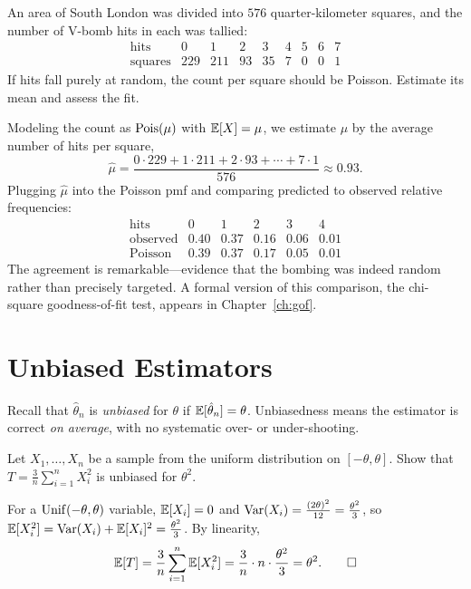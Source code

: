 \begin{example}
An area of South London was divided into $576$ quarter-kilometer squares, and the
number of V-bomb hits in each was tallied:
\[
\begin{array}{c|cccccccc}
\text{hits} & 0 & 1 & 2 & 3 & 4 & 5 & 6 & 7\\\hline
\text{squares} & 229 & 211 & 93 & 35 & 7 & 0 & 0 & 1
\end{array}
\]
If hits fall purely at random, the count per square should be Poisson. Estimate
its mean and assess the fit.

\solution Modeling the count as $\mathrm{Pois}(\mu)$ with $\mathbb{E}[X]=\mu$, we estimate $\mu$
by the average number of hits per square,
\[
  \hat\mu=\frac{0\cdot 229+1\cdot 211+2\cdot 93+\cdots+7\cdot 1}{576}\approx 0.93.
\]
Plugging $\hat\mu$ into the Poisson pmf and comparing predicted to observed
relative frequencies:
\[
\begin{array}{c|ccccc}
\text{hits} & 0 & 1 & 2 & 3 & 4\\\hline
\text{observed} & 0.40 & 0.37 & 0.16 & 0.06 & 0.01\\
\text{Poisson} & 0.39 & 0.37 & 0.17 & 0.05 & 0.01
\end{array}
\]
The agreement is remarkable—evidence that the bombing was indeed random rather
than precisely targeted. A formal version of this comparison, the chi-square
goodness-of-fit test, appears in Chapter~\ref{ch:gof}.
\end{example}

\section{Unbiased Estimators}

Recall that $\hat\theta_n$ is \emph{unbiased} for $\theta$ if
$\mathbb{E}[\hat\theta_n]=\theta$. Unbiasedness means the estimator is correct
\emph{on average}, with no systematic over- or under-shooting.

\begin{example}
Let $X_1,\dots,X_n$ be a sample from the uniform distribution on $[-\theta,\theta]$.
Show that $T=\tfrac3n\sum_{i=1}^n X_i^2$ is unbiased for $\theta^2$.

\solution For a $\mathrm{Unif}(-\theta,\theta)$ variable, $\mathbb{E}[X_i]=0$ and
$\mathrm{Var}(X_i)=\tfrac{(2\theta)^2}{12}=\tfrac{\theta^2}{3}$, so
$\mathbb{E}[X_i^2]=\mathrm{Var}(X_i)+\mathbb{E}[X_i]^2=\tfrac{\theta^2}{3}$. By linearity,
\[
  \mathbb{E}[T]=\frac3n\sum_{i=1}^n\mathbb{E}[X_i^2]=\frac3n\cdot n\cdot\frac{\theta^2}{3}=\theta^2. \qedhere
\]
\end{example}

